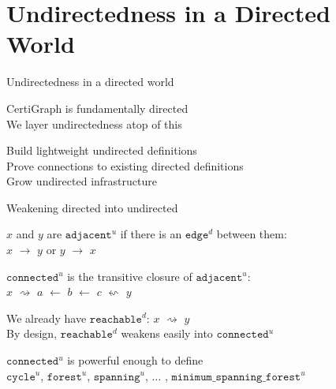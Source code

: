 \documentclass[usenames, xcolor=dvipsnames]{beamer}
\newcommand{\m}[1]{\ensuremath{\mathit{#1}}} %
\begin{document}
\section{Undirectedness in a Directed World}

\begin{frame}[fragile]{Undirectedness in a directed world}

CertiGraph is fundamentally directed \\
We layer undirectedness atop of this

\pause \bigskip

\hspace{1em} Build lightweight undirected definitions \\
\hspace{1em} Prove connections to existing directed definitions \\
\hspace{1em} Grow undirected infrastructure

\end{frame}

\begin{frame}{Weakening directed into undirected}

\m{x} and \m{y} are $\texttt{adjacent}^{u}$ if there is an $\texttt{edge}^{d}$ between them: \\
\hspace{1em} \m{x} $\rightarrow$ \m{y} or \m{y} $\rightarrow$ \m{x} \\

\pause \bigskip

$\texttt{connected}^{u}$ is the transitive closure of $\texttt{adjacent}^{u}$: \\
\hspace{1em} \m{x} $\rightsquigarrow$ \m{a} $\leftarrow$ \m{b} $\leftarrow$ \m{c} $\leftsquigarrow$ \m{y} \\

\pause \bigskip

We already have $\texttt{reachable}^{d}$: \hspace{0.5em} \m{x} $\rightsquigarrow$ \m{y} \\
\pause
By design, $\texttt{reachable}^{d}$ weakens easily into $\texttt{connected}^{u}$

\pause \bigskip

$\texttt{connected}^{u}$ is powerful enough to define \\
$\texttt{cycle}^{u}$, $\texttt{forest}^{u}$, $\texttt{spanning}^{u}$, $\ldots$ ,
$\texttt{minimum\_spanning\_forest}^{u}$

\end{frame}
\end{document}
